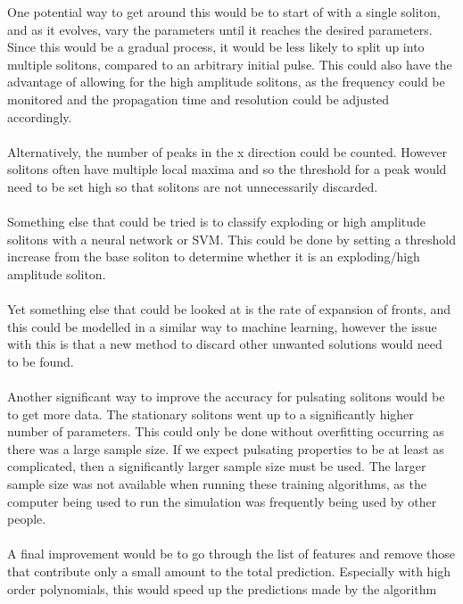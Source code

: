 \documentclass[a4paper,12pt]{report}
\begin{document}
One potential way to get around this would be to start of with a single soliton, and as it evolves, vary the parameters until it reaches the desired parameters. Since this would be a gradual process, it would be less likely to split up into multiple solitons, compared to an arbitrary initial pulse. This could also have the advantage of allowing for the high amplitude solitons, as the frequency could be monitored and the propagation time and resolution could be adjusted accordingly. 
\\\\
Alternatively, the number of peaks in the x direction could be counted. However solitons often have multiple local maxima and so the threshold for a peak would need to be set high so that solitons are not unnecessarily discarded.
\\\\
Something else that could be tried is to classify exploding or high amplitude solitons with a neural network or SVM. This could be done by setting a threshold increase from the base soliton to determine whether it is an exploding/high amplitude soliton. 
\\\\
Yet something else that could be looked at is the rate of expansion of fronts, and this could be modelled in a similar way to machine learning, however the issue with this is that a new method to discard other unwanted solutions would need to be found. 
\\\\
Another significant way to improve the accuracy for pulsating solitons would be to get more data. The stationary solitons went up to a significantly higher number of parameters. This could only be done without overfitting occurring as there was a large sample size. If we expect pulsating properties to be at least as complicated, then a significantly larger sample size must be used. The larger sample size was not available when running these training algorithms, as the computer being used to run the simulation was frequently being used by other people. 
\\\\
A final improvement would be to go through the list of features and remove those that contribute only a small amount to the total prediction. Especially with high order polynomials, this would speed up the predictions made by the algorithm
\end{document}
